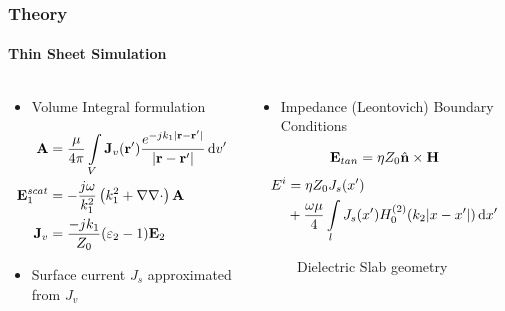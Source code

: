 \documentclass[mathserif,18pt,xcolor=table]{beamer}
\begin{document}
\begin{frame}
  \frametitle{Theory}
  \framesubtitle{Thin Sheet Simulation}
  \begin{columns}[T] %
    \begin{column}{.5\textwidth}
      \begin{itemize}
        \item{Volume Integral formulation}
      \end{itemize}
      \begin{equation} \nonumber
        \begin{split}
          \mathbf{A} &= \frac{\mu}{4 \pi} \int\limits_{V} \mathbf{J}_v(\mathbf{r}')  \frac{ e^{-j k_1 |\mathbf{r} - \mathbf{r}'|}}{|\mathbf{r} - \mathbf{r}'|} \mathop{}\!\mathrm{d}{v'} \\
          \mathbf{E}_1^{scat} &= -\frac{j \omega}{k_1^2} \left( k_1^2 + \nabla \nabla \cdot \right) \mathbf{A} \\
          \mathbf{J}_v &= \frac{-j k_1}{Z_0}(\varepsilon_2 - 1)\mathbf{E}_2
        \end{split}
        \label{eq:E1sc}
      \end{equation}
      \begin{itemize}
        \item{Surface current $J_s$ approximated from $J_v$}
      \end{itemize}
    \end{column}
    \begin{column}[T]{.5\textwidth}
      \vspace*{-2cm}
      \begin{itemize}
        \item{Impedance (Leontovich) Boundary Conditions}
      \end{itemize}
      \begin{equation} \nonumber
        \mathbf{E}_{tan} = \eta Z_0 \hat{\mathbf{n}} \times \mathbf{H}
        \label{eq:eps}
      \end{equation}
      \begin{equation} \nonumber
        \begin{split}
          E^i &= \eta Z_0 J_s(x') \\
          & + \frac{\omega \mu}{4}  \int\limits_{l} J_s(x')  H_0^{(2)}(k_2 |x - x'|) \mathop{}\!\mathrm{d}{x'}
        \end{split}
        \label{eq:eps}
      \end{equation}
      \begin{figure}
        \def\svgwidth{.75\linewidth}
        
        \caption{Dielectric Slab geometry}
      \end{figure}
      \end{column}%
    \end{columns}
  \end{frame}
\end{document}
